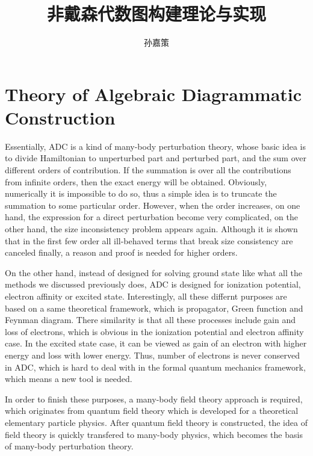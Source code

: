 \documentclass[bachelor, english]{ustcthesis}
\title{非戴森代数图构建理论与实现}
\author{孙嘉策}
\begin{document}
\maketitle
\makestatement

\frontmatter

\tableofcontents


\mainmatter

\chapter{Theory of Algebraic Diagrammatic Construction}

Essentially, ADC is a kind of many-body perturbation theory, whose basic idea is to divide Hamiltonian to unperturbed part and perturbed part, and the sum over different orders of contribution.
If the summation is over all the contributions from infinite orders, then the exact energy will be obtained.
Obviously, numerically it is impossible to do so, thus a simple idea is to truncate the summation to some particular order.
However, when the order increases, on one hand, the expression for a direct perturbation become very complicated, on the other hand, the size inconsistency problem appears again.
Although it is shown that in the first few order all ill-behaved terms that break size consistency are canceled finally, a reason and proof is needed for higher orders.

On the other hand, instead of designed for solving ground state like what all the methods we discussed previously does, ADC is designed for ionization potential, electron affinity or excited state.
Interestingly, all these differnt purposes are based on a same theoretical framework, which is propagator, Green function and Feynman diagram.
There similarity is that all these processes include gain and loss of electrons, which is obvious in the ionization potential and electron affinity case.
In the excited state case, it can be viewed as gain of an electron with higher energy and loss with lower energy.
Thus, number of electrons is never conserved in ADC, which is hard to deal with in the formal quantum mechanics framework, which means a new tool is needed.

In order to finish these purposes, a many-body field theory approach is required, which originates from quantum field theory which is developed for a theoretical elementary particle physics.
After quantum field theory is constructed, the idea of field theory is quickly transfered to many-body physics, which becomes the basis of many-body perturbation theory.
\end{document}

